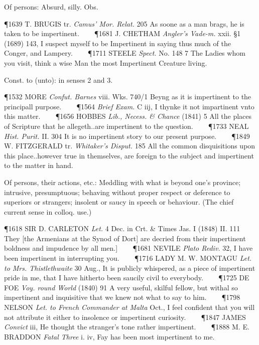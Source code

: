 \begin{description}[wide, labelwidth=!, labelindent=0pt]
\begin{myenumerate}
 Of persons: Absurd, silly. Obs.

\P 1639 T. BRUGIS tr.  \textit{Camus' Mor. Relat.} 205 As soone as a man brags, he is taken to be impertinent.    
\P 1681 J. CHETHAM  \textit{Angler's Vade-m.} xxii. §1 (1689) 143, I suspect myself to be Impertinent in saying thus much of the Conger, and Lampery.    
\P 1711 STEELE  \textit{Spect.} No. 148 7 The Ladies whom you visit, think a wise Man the most Impertinent Creature living.

 Const. to (unto): in senses 2 and 3.

\P 1532 MORE  \textit{Confut. Barnes} viii. Wks. 740/1 Beyng as it is impertinent to the principall purpose.    
\P 1564  \textit{Brief Exam.} C iij, I thynke it not impartinent vnto this matter.    
\P 1656 HOBBES  \textit{Lib., Necess. \& Chance} (1841) 5 All the places of Scripture that he allegeth..are impertinent to the question.    
\P 1733 NEAL  \textit{Hist. Purit.} II. 304 It is no impertinent story to our present purpose.    
\P 1849 W. FITZGERALD tr.  \textit{Whitaker's Disput.} 185 All the common disquisitions upon this place..however true in themselves, are foreign to the subject and impertinent to the matter in hand.

 Of persons, their actions, etc.: Meddling with what is beyond one's province; intrusive, presumptuous; behaving without proper respect or deference to superiors or strangers; insolent or saucy in speech or behaviour. (The chief current sense in colloq. use.)

\P 1618 SIR D. CARLETON  \textit{Let.} 4 Dec. in Crt. \& Times Jas. I (1848) II. 111 They [the Armenians at the Synod of Dort] are decried from their impertinent boldness and impudence by all men.]    
\P 1681 NEVILE  \textit{Plato Rediv.} 32, I have been impertinent in interrupting you.    
\P 1716 LADY M. W. MONTAGU  \textit{Let. to Mrs. Thistlethwaite} 30 Aug., It is publicly whispered, as a piece of impertinent pride in me, that I have hitherto been saucily civil to everybody.    
\P 1725 DE FOE  \textit{Voy. round World} (1840) 91 A very useful, skilful fellow, but withal so impertinent and inquisitive that we knew not what to say to him.    
\P 1798 NELSON  \textit{Let. to French Commander at Malta} Oct., I feel confident that you will not attribute it either to insolence or impertinent curiosity.    
\P 1847 JAMES  \textit{Convict} iii, He thought the stranger's tone rather impertinent.    
\P 1888 M. E. BRADDON  \textit{Fatal Three} i. iv, Fay has been most impertinent to me.


\end{myenumerate}
\end{description}
